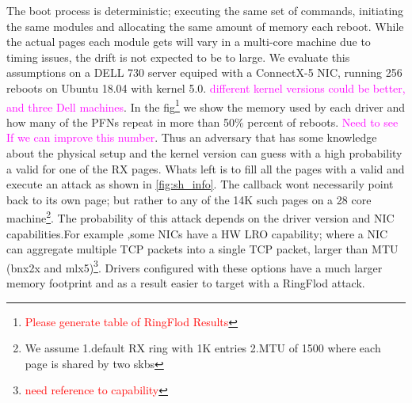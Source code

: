 The boot process is deterministic; executing the same set of commands, initiating the same modules and allocating the same amount of memory each reboot. While the actual pages each module gets will vary in a multi-core machine due to timing issues, the drift is not expected to be to large. We evaluate this assumptions on a DELL 730 server equiped with a ConnectX-5 NIC, running 256 reboots on Ubuntu 18.04 with kernel 5.0. \textcolor{magenta}{different kernel versions could be better, and three Dell machines}. In the fig\footnote{\textcolor{red}{Please generate table of RingFlod Results}} we show the memory used by each driver and how many of the PFNs repeat in more than 50\% percent of reboots. \textcolor{magenta}{Need to see If we can improve this number}. Thus an adversary that has some knowledge about the physical setup and the kernel version can guess with a high probability a valid \kva for one of the RX pages. Whats left is to fill all the pages with a valid \mabaf and execute an attack as shown in \ref{fig:sh_info}. The callback wont necessarily point back to its own page; but rather to any of the 14K such pages on a 28 core machine\footnote{We assume 1.default RX ring with 1K entries 2.MTU of 1500 where each page is shared by two skbs}. The probability of this attack depends on the driver version and NIC capabilities.For example ,some NICs have a HW LRO capability; where a NIC can aggregate multiple TCP packets into a single TCP packet, larger than MTU (bnx2x and mlx5)\footnote{\textcolor{red}{need reference to capability}}. Drivers configured with these options have a much larger memory footprint and as a result easier to target with a RingFlod attack.  


